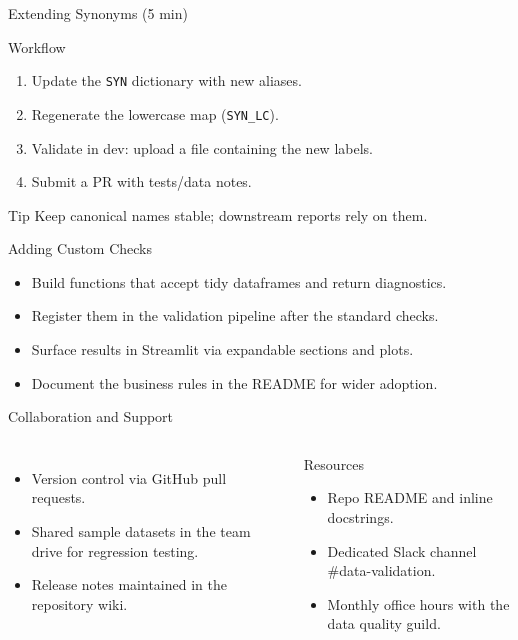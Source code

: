 \documentclass[aspectratio=169]{beamer}
\begin{document}
\begin{frame}{Extending Synonyms (5 min)}
  \begin{block}{Workflow}
    \begin{enumerate}
      \item Update the \texttt{SYN} dictionary with new aliases.
      \item Regenerate the lowercase map (\texttt{SYN\_LC}).
      \item Validate in dev: upload a file containing the new labels.
      \item Submit a PR with tests/data notes.
    \end{enumerate}
  \end{block}
  \begin{alertblock}{Tip}
    Keep canonical names stable; downstream reports rely on them.
  \end{alertblock}
\end{frame}

\begin{frame}{Adding Custom Checks}
  \begin{itemize}
    \item Build functions that accept tidy dataframes and return diagnostics.
    \item Register them in the validation pipeline after the standard checks.
    \item Surface results in Streamlit via expandable sections and plots.
    \item Document the business rules in the README for wider adoption.
  \end{itemize}
\end{frame}

\begin{frame}{Collaboration and Support}
  \begin{columns}[T]
      \begin{itemize}
        \item Version control via GitHub pull requests.
        \item Shared sample datasets in the team drive for regression testing.
        \item Release notes maintained in the repository wiki.
      \end{itemize}
      \begin{block}{Resources}
        \begin{itemize}
          \item Repo README and inline docstrings.
          \item Dedicated Slack channel \#data-validation.
          \item Monthly office hours with the data quality guild.
        \end{itemize}
      \end{block}
  \end{columns}
\end{frame}
\end{document}
